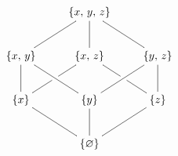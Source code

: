 \documentclass{article}
\begin{document}
\preview
$%
\def\arl{\ar@{-}}
\xymatrix{
        & \{x,\,y,\,z\}\arl[dl]\arl[d]\arl[dr] & \\
\{x,\,y\}\arl[d]\arl[dr] & \{x,\,z\}\arl[dl]|\hole\arl[dr]|\hole & \{y,\,z\}\arl[dl]\arl[d] \\
\{x\}\arl[dr]   & \{y\}\arl[d]   & \{z\}\arl[dl] \\
        & \{\varnothing\} \\
}
$
\endpreview
\end{document}
